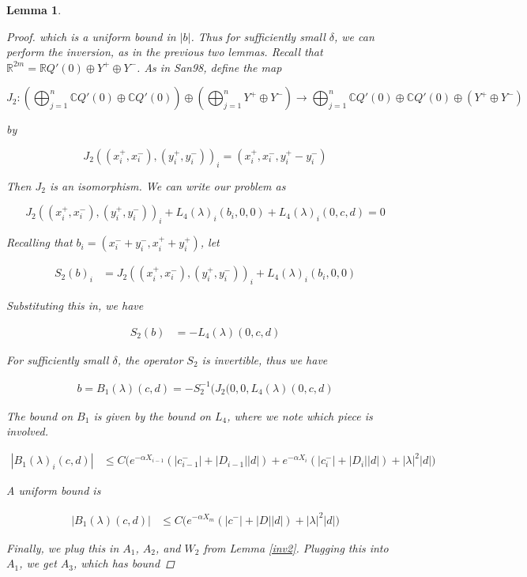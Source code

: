 \documentclass[12pt]{article}
\def\R{{\mathbb R}}
\def\C{{\mathbb C}}
\newtheorem{lemma}{Lemma}
\begin{document}
\begin{lemma}
\begin{proof}
which is a uniform bound in $|b|$. Thus for sufficiently small $\delta$, we can perform the inversion, as in the previous two lemmas. Recall that $\R^{2m} = \R Q'(0) \oplus Y^+ \oplus Y^-$. As in San98, define the map

\[
J_2: \left( \bigoplus_{j=1}^n \C Q'(0) \oplus \C Q'(0) \right) \oplus
\left( \bigoplus_{j=1}^n Y^+ \oplus Y^- \right) 
\rightarrow \bigoplus_{j=1}^n \C Q'(0) \oplus \C Q'(0) \oplus (Y^+ \oplus Y^-)
\]

by 

\[
J_2( (x_i^+, x_i^-),(y_i^+, y_i^-))_i = ( x_i^+, x_i^-, y_i^+ - y_i^- )
\]

Then $J_2$ is an isomorphism. We can write our problem as 

\[
J_2( (x_i^+, x_i^-),(y_i^+, y_i^-))_i 
+ L_4(\lambda)_i(b_i, 0, 0) + L_4(\lambda)_i(0, c, d) = 0
\]

Recalling that $b_i = (x_i^- + y_i^-, x_i^+ + y_i^+)$, let

\begin{align*}
S_2(b)_i &= J_2( (x_i^+, x_i^-),(y_i^+, y_i^-))_i 
+ L_4(\lambda)_i(b_i, 0, 0) 
\end{align*}

Substituting this in, we have

\begin{align*}
S_2(b) &= -L_4(\lambda)(0, c, d)
\end{align*}

For sufficiently small $\delta$, the operator $S_2$ is invertible, thus we have

\begin{align}
b = B_1(\lambda)(c,d) 
= -S_2^{-1} ( J_2(0, 0,L_4(\lambda)(0, c, d)
\end{align}

The bound on $B_1$ is given by the bound on $L_4$, where we note which piece is involved.

\begin{align*}
|B_1(\lambda)_i(c, d)| &\leq C \Big( 
e^{-\alpha X_{i-1}}( |c_{i-1}^-| + |D_{i-1}||d| )
+ e^{-\alpha X_i}( |c_i^-| + |D_i||d| )
+ |\lambda|^2 |d| \Big)
\end{align*}

A uniform bound is

\begin{align*}
|B_1(\lambda)(c, d)| &\leq C \Big( 
e^{-\alpha X_m}( |c^-| + |D||d|) + |\lambda|^2 |d| \Big)
\end{align*}

Finally, we plug this in $A_1$, $A_2$, and $W_2$ from Lemma \ref{inv2}. Plugging this into $A_1$, we get $A_3$, which has bound


\end{proof}
\end{lemma}
\end{document}
